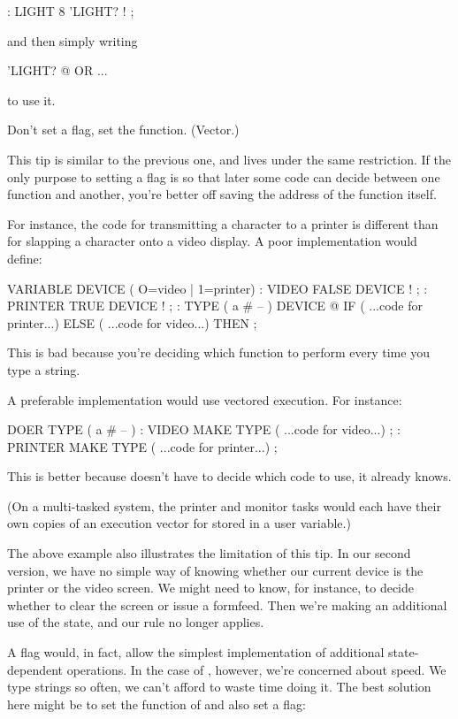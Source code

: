 \begin{Code}
: LIGHT   8 'LIGHT? ! ;
\end{Code}
and then simply writing

\begin{Code}
'LIGHT? @  OR ...
\end{Code}
to use it.

\begin{tip}
Don't set a flag, set the function. (Vector.)
\end{tip}
This tip is similar to the previous one, and lives under the same
restriction. If the only purpose to setting a flag is so that later some
code can decide between one function and another, you're better off saving
the address of the function itself.

For instance, the code for transmitting a character to a printer is
different than for slapping a character onto a video display. A poor
implementation would define:

\begin{Code}
VARIABLE DEVICE  ( O=video | 1=printer)
: VIDEO   FALSE DEVICE ! ;
: PRINTER   TRUE DEVICE ! ;
: TYPE  ( a # -- ) DEVICE @ IF
   ( ...code for printer...) ELSE
   ( ...code for video...)  THEN ;
\end{Code}
This is bad because you're deciding which function to perform every time
you type a string.

A preferable implementation would use vectored execution. For
instance:

\begin{Code}
DOER TYPE  ( a # -- )
: VIDEO   MAKE TYPE ( ...code for video...) ;
: PRINTER   MAKE TYPE ( ...code for printer...) ;
\end{Code}
This is better because  doesn't have to decide which code to use, it
already knows.

(On a multi-tasked system, the printer and monitor tasks would
each have their own copies of an execution vector for 
stored in a user variable.)

The above example also illustrates the limitation of this tip. In our
second version, we have no simple way of knowing whether our current
device is the printer or the video screen. We might need to know, for
instance, to decide whether to clear the screen or issue a formfeed. Then
we're making an additional use of the state, and our rule no longer
applies.

A flag would, in fact, allow the simplest implementation of additional
state-dependent operations. In the case of , however, we're
concerned about speed. We type strings so often, we can't afford to waste
time doing it. The best solution here might be to set the function of
 and also set a flag:

